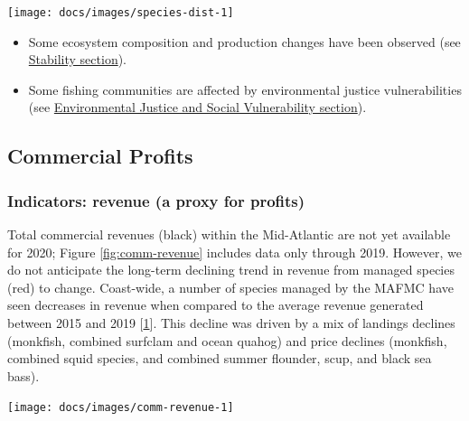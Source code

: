 \documentclass[
  10pt,
]{article}
\providecommand{\tightlist}{%
  \setlength{\itemsep}{0pt}\setlength{\parskip}{0pt}}
\let\origfigure\figure
\let\endorigfigure\endfigure
\renewenvironment{figure}[1][2] {
    \expandafter\origfigure\expandafter[H]
} {
    \endorigfigure
}
\begin{document}
\begin{figure}

{\centering \texttt{[image: docs/images/species-dist-1]} 

}

\caption{Aggregate species distribution metrics for species in the Northeast Large Marine Ecosystem.}\label{fig:species-dist}
\end{figure}

\begin{itemize}
\tightlist
\item
  Some ecosystem composition and production changes have been observed
  (see \protect\hyperlink{stability}{Stability section}).
\item
  Some fishing communities are affected by environmental justice
  vulnerabilities (see
  \protect\hyperlink{social-vulnerability}{Environmental Justice and
  Social Vulnerability section}).
\end{itemize}

\hypertarget{commercial-profits}{%
\subsection{Commercial Profits}\label{commercial-profits}}

\hypertarget{indicators-revenue-a-proxy-for-profits}{%
\subsubsection{Indicators: revenue (a proxy for
profits)}\label{indicators-revenue-a-proxy-for-profits}}

Total commercial revenues (black) within the Mid-Atlantic are not yet
available for 2020; Figure \ref{fig:comm-revenue} includes data only
through 2019. However, we do not anticipate the long-term declining
trend in revenue from managed species (red) to change. Coast-wide, a
number of species managed by the MAFMC have seen decreases in revenue
when compared to the average revenue generated between 2015 and 2019
{[}\protect\hyperlink{ref-thunberg_northeast_2021}{1}{]}. This decline
was driven by a mix of landings declines (monkfish, combined surfclam
and ocean quahog) and price declines (monkfish, combined squid species,
and combined summer flounder, scup, and black sea bass).

\begin{figure}

{\centering \texttt{[image: docs/images/comm-revenue-1]} 

}

\caption{Revenue through 2019 for the for the Mid-Atlantic region: total (black) and from MAFMC managed species (red).}\label{fig:comm-revenue}
\end{figure}
\end{document}

